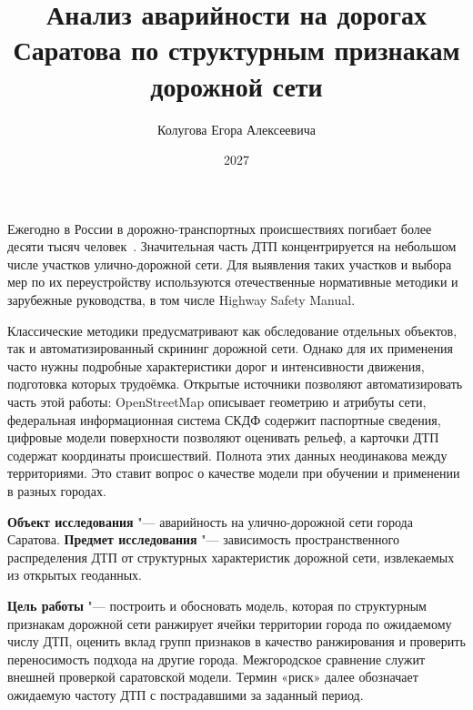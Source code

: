\documentclass[coursework]{SCWorks}
\begin{document}
\title{Анализ аварийности на дорогах Саратова по структурным признакам дорожной сети}
\author{Колугова Егора Алексеевича}



\date{2027}

\maketitle
\secNumbering
\tableofcontents

\intro

Ежегодно в России в дорожно-транспортных происшествиях погибает более
десяти тысяч человек~\cite{gibddstat}. Значительная часть ДТП
концентрируется на небольшом числе участков улично-дорожной сети.
Для выявления таких участков и выбора мер по их переустройству
используются отечественные нормативные методики и зарубежные
руководства, в том числе Highway Safety Manual.

Классические методики предусматривают как обследование отдельных
объектов, так и автоматизированный скрининг дорожной сети. Однако для их
применения часто нужны подробные характеристики дорог и интенсивности
движения, подготовка которых трудоёмка. Открытые источники позволяют
автоматизировать часть этой работы: OpenStreetMap описывает геометрию и
атрибуты сети, федеральная информационная система СКДФ содержит
паспортные сведения, цифровые модели поверхности позволяют оценивать
рельеф, а карточки ДТП содержат координаты происшествий. Полнота этих
данных неодинакова между территориями. Это ставит вопрос о качестве
модели при обучении и применении в разных городах.

\textbf{Объект исследования} "--- аварийность на улично-дорожной сети
города Саратова. \textbf{Предмет исследования} "--- зависимость
пространственного распределения ДТП от структурных характеристик
дорожной сети, извлекаемых из открытых геоданных.

\textbf{Цель работы} "--- построить и обосновать модель, которая по
структурным признакам дорожной сети ранжирует ячейки территории города
по ожидаемому числу ДТП, оценить вклад групп признаков в качество
ранжирования и проверить переносимость подхода на другие города.
Межгородское сравнение служит внешней проверкой саратовской модели.
Термин «риск» далее обозначает ожидаемую частоту ДТП с пострадавшими
за заданный период.
\end{document}
